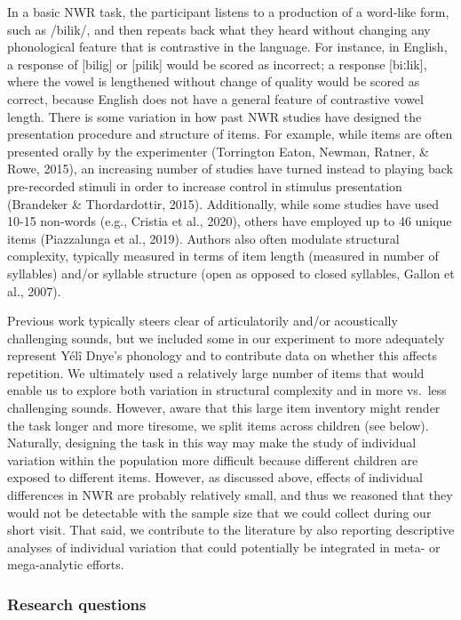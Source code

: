 \documentclass[english,,man,floatsintext]{apa6}
\begin{document}
In a basic NWR task, the participant listens to a production of a word-like form, such as /bilik/, and then repeats back what they heard without changing any phonological feature that is contrastive in the language. For instance, in English, a response of {[}bilig{]} or {[}pilik{]} would be scored as incorrect; a response {[}biːlik{]}, where the vowel is lengthened without change of quality would be scored as correct, because English does not have a general feature of contrastive vowel length. There is some variation in how past NWR studies have designed the presentation procedure and structure of items. For example, while items are often presented orally by the experimenter (Torrington Eaton, Newman, Ratner, \& Rowe, 2015), an increasing number of studies have turned instead to playing back pre-recorded stimuli in order to increase control in stimulus presentation (Brandeker \& Thordardottir, 2015). Additionally, while some studies have used 10-15 non-words (e.g., Cristia et al., 2020), others have employed up to 46 unique items (Piazzalunga et al., 2019). Authors also often modulate structural complexity, typically measured in terms of item length (measured in number of syllables) and/or syllable structure (open as opposed to closed syllables, Gallon et al., 2007).

Previous work typically steers clear of articulatorily and/or acoustically challenging sounds, but we included some in our experiment to more adequately represent Yélî Dnye's phonology and to contribute data on whether this affects repetition. We ultimately used a relatively large number of items that would enable us to explore both variation in structural complexity and in more vs.~less challenging sounds. However, aware that this large item inventory might render the task longer and more tiresome, we split items across children (see below). Naturally, designing the task in this way may make the study of individual variation within the population more difficult because different children are exposed to different items. However, as discussed above, effects of individual differences in NWR are probably relatively small, and thus we reasoned that they would not be detectable with the sample size that we could collect during our short visit. That said, we contribute to the literature by also reporting descriptive analyses of individual variation that could potentially be integrated in meta- or mega-analytic efforts.

\hypertarget{research-questions}{%
\subsubsection{Research questions}\label{research-questions}}
\end{document}
